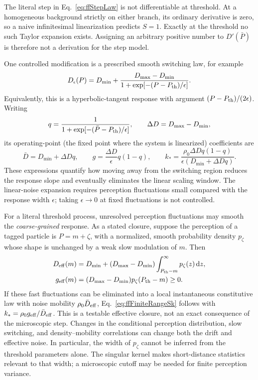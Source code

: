 \documentclass{article}
\begin{document}
The literal step in Eq.~\eqref{eq:ffStepLaw} is not differentiable at threshold. At a homogeneous background strictly on either branch, its ordinary derivative is zero, so a naive infinitesimal linearization predicts $S=1$. Exactly at the threshold no such Taylor expansion exists. Assigning an arbitrary positive number to $D'(\bar P)$ is therefore not a derivation for the step model.

One controlled modification is a prescribed smooth switching law, for example
\begin{equation}
    D_\epsilon(P)=D_{\min}+
    \frac{D_{\max}-D_{\min}}{1+\exp[-(P-P_{\rm th})/\epsilon]}.
\end{equation}
Equivalently, this is a hyperbolic-tangent response with argument $(P-P_{\rm th})/(2\epsilon)$. Writing
\begin{equation}
    q=\frac{1}{1+\exp[-(\bar P-P_{\rm th})/\epsilon]},\qquad
    \Delta D=D_{\max}-D_{\min},
\end{equation}
its operating-point (the fixed point where the system is linearized) coefficients are
\begin{equation}
    \bar D=D_{\min}+\Delta D q,\qquad
    g=\frac{\Delta D}{\epsilon}q(1-q),\qquad
    k_* =\frac{\rho_0\Delta D q(1-q)}{\epsilon(D_{\min}+\Delta Dq)}.
    \label{eq:ffLogisticGeneral}
\end{equation}
These expressions quantify how moving away from the switching region reduces the response slope and eventually eliminates the linear scaling window.
The linear-noise expansion requires perception fluctuations small compared with the response width $\epsilon$; taking $\epsilon\to0$ at fixed fluctuations is not controlled.

For a literal threshold process, unresolved perception fluctuations may smooth the \emph{coarse-grained} response. As a stated closure, suppose the perception of a tagged particle is $P=m+\zeta$, with a normalized, smooth probability density $p_\zeta$ whose shape is unchanged by a weak slow modulation of $m$. Then
\begin{align}
    D_{\rm eff}(m)&=D_{\min}+(D_{\max}-D_{\min})
    \int_{P_{\rm th}-m}^{\infty}p_\zeta(z)\,\mathrm dz,\\
    g_{\rm eff}(m)&=(D_{\max}-D_{\min})p_\zeta(P_{\rm th}-m)\geq0.
    \label{eq:ffThresholdClosure}
\end{align}
If these fast fluctuations can be eliminated into a local instantaneous constitutive law with noise mobility $\rho_0\bar D_{\rm eff}$, Eq.~\eqref{eq:ffFiniteRangeSk} follows with $k_* =\rho_0g_{\rm eff}/\bar D_{\rm eff}$. This is a testable effective closure, not an exact consequence of the microscopic step. Changes in the conditional perception distribution, slow switching, and density--mobility correlations can change both the drift and effective noise. In particular, the width of $p_\zeta$ cannot be inferred from the threshold parameters alone. The singular kernel makes short-distance statistics relevant to that width; a microscopic cutoff may be needed for finite perception variance.
\end{document}
